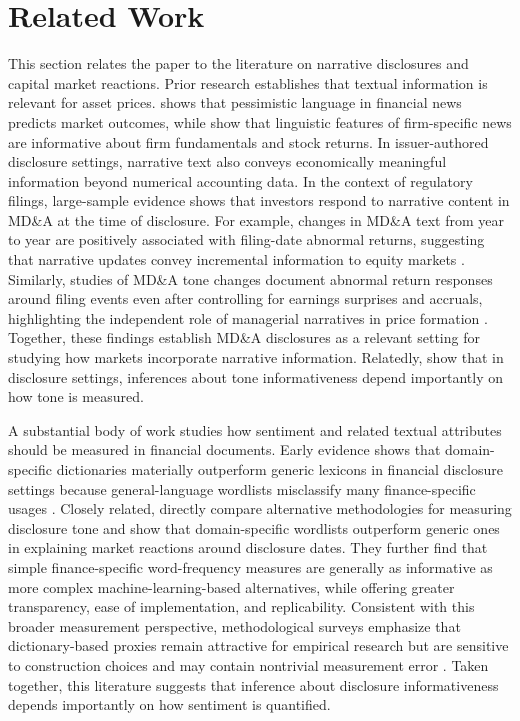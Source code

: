 \section{Related Work}

This section relates the paper to the literature on narrative disclosures and capital market reactions. Prior research establishes that textual information is relevant for asset prices. \citet{tetlock2007giving} shows that pessimistic language in financial news predicts market outcomes, while \citet{tetlock2008morethanwords} show that linguistic features of firm-specific news are informative about firm fundamentals and stock returns. In issuer-authored disclosure settings, narrative text also conveys economically meaningful information beyond numerical accounting data. In the context of regulatory filings, large-sample evidence shows that investors respond to narrative content in MD\&A at the time of disclosure. For example, changes in MD\&A text from year to year are positively associated with filing-date abnormal returns, suggesting that narrative updates convey incremental information to equity markets \citep{brown2011mda}. Similarly, studies of MD\&A tone changes document abnormal return responses around filing events even after controlling for earnings surprises and accruals, highlighting the independent role of managerial narratives in price formation \citep{feldman2010tone}. Together, these findings establish MD\&A disclosures as a relevant setting for studying how markets incorporate narrative information. Relatedly, \citet{henry2016measuring} show that in disclosure settings, inferences about tone informativeness depend importantly on how tone is measured.

A substantial body of work studies how sentiment and related textual attributes should be measured in financial documents. Early evidence shows that domain-specific dictionaries materially outperform generic lexicons in financial disclosure settings because general-language wordlists misclassify many finance-specific usages \citep{loughran2011liability}. Closely related, \citet{henry2016measuring} directly compare alternative methodologies for measuring disclosure tone and show that domain-specific wordlists outperform generic ones in explaining market reactions around disclosure dates. They further find that simple finance-specific word-frequency measures are generally as informative as more complex machine-learning-based alternatives, while offering greater transparency, ease of implementation, and replicability. Consistent with this broader measurement perspective, methodological surveys emphasize that dictionary-based proxies remain attractive for empirical research but are sensitive to construction choices and may contain nontrivial measurement error \citep{loughranmcdonald2016survey}. Taken together, this literature suggests that inference about disclosure informativeness depends importantly on how sentiment is quantified.

